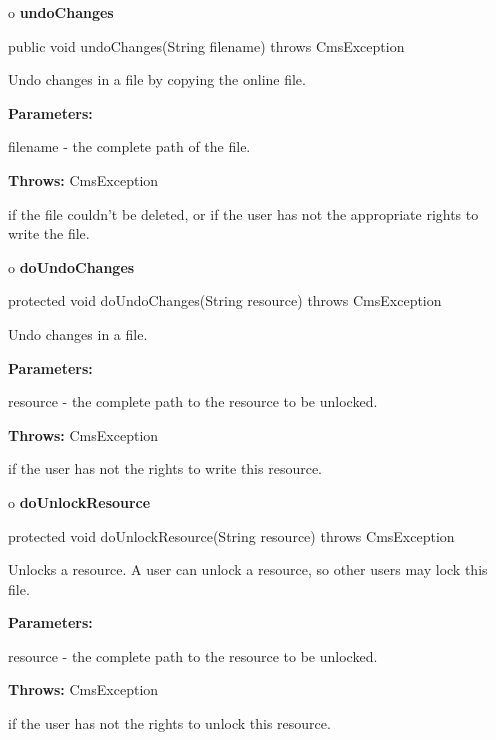 o {\bf undoChanges}

\begin{PRE}
 public void undoChanges(String filename) throws CmsException
\end{PRE}

\begin{description}
\htmlDD Undo changes in a file by copying the online file.

\begin{description}
\item {\bf Parameters:}

filename - the complete path of the file.
\item {\bf Throws:} CmsException

if the file couldn't be deleted, or if the user has not the appropriate rights
to write the file.
\end{description}

\end{description}

o {\bf doUndoChanges}

\begin{PRE}
 protected void doUndoChanges(String resource) throws CmsException
\end{PRE}

\begin{description}
\htmlDD Undo changes in a file. \htmlBR

\begin{description}
\item {\bf Parameters:}

resource - the complete path to the resource to be unlocked.
\item {\bf Throws:} CmsException

if the user has not the rights to write this resource.
\end{description}

\end{description}

o {\bf doUnlockResource}

\begin{PRE}
 protected void doUnlockResource(String resource) throws CmsException
\end{PRE}

\begin{description}
\htmlDD Unlocks a resource. \htmlBR
A user can unlock a resource, so other users may lock this file.

\begin{description}
\item {\bf Parameters:}

resource - the complete path to the resource to be unlocked.
\item {\bf Throws:} CmsException

if the user has not the rights to unlock this resource.
\end{description}

\end{description}

